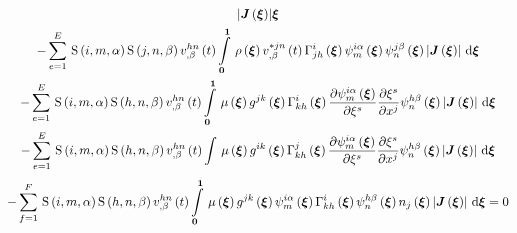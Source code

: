 \begin{multline}
{{      \abs{\fnof{\matr{J}}{\vectr{\xi}}}}{\vectr{\xi}}}\\
  -\gsum{e=1}{E}{\idxgsf{i}{m}{\alpha}\idxgsf{j}{n}{\beta}\fnof{\idxnodedof{v}{h}{n}{\beta}}{t}
    \gint{\vectr{0}}{\vectr{1}}{\fnof{\rho}{\vectr{\xi}}\fnof{\idxnodedof{v}{*j}{n}{\beta}}{t}
      \fnof{\christoffel{i}{j}{h}}{\vectr{\xi}}\idxgbfn{i}{m}{\alpha}{\vectr{\xi}}
      \idxgbfn{j}{n}{\beta}{\vectr{\xi}}\abs{\fnof{\matr{J}}{\vectr{\xi}}}}{\vectr{\xi}}}\\
  -\gsum{e=1}{E}{\idxgsf{i}{m}{\alpha}\idxgsf{h}{n}{\beta}\fnof{\idxnodedof{v}{h}{n}{\beta}}{t}
    \gint{\vectr{0}}{\vectr{1}}{\fnof{\mu}{\vectr{\xi}}\fnof{g^{jk}}{\vectr{\xi}}\fnof{\christoffel{i}{k}{h}}{\vectr{\xi}}
      \delby{\idxgbfn{i}{m}{\alpha}{\vectr{\xi}}}{\xi^{s}}\delby{\xi^{s}}{x^{j}}
      \idxgbfn{h}{n}{\beta}{\vectr{\xi}}\abs{\fnof{\matr{J}}{\vectr{\xi}}}}{\vectr{\xi}}}\\
  -\gsum{e=1}{E}{\idxgsf{i}{m}{\alpha}\idxgsf{h}{n}{\beta}\fnof{\idxnodedof{v}{h}{n}{\beta}}{t}
    \gint{}{}{\fnof{\mu}{\vectr{\xi}}\fnof{g^{ik}}{\vectr{\xi}}\fnof{\christoffel{j}{k}{h}}{\vectr{\xi}}
      \delby{\idxgbfn{i}{m}{\alpha}{\vectr{\xi}}}{\xi^{s}}\delby{\xi^{s}}{x^{j}}
      \idxgbfn{h}{n}{\beta}{\vectr{\xi}}\abs{\fnof{\matr{J}}{\vectr{\xi}}}}{\vectr{\xi}}}\\
  -\gsum{f=1}{F}{\idxgsf{i}{m}{\alpha}\idxgsf{h}{n}{\beta}\fnof{\idxnodedof{v}{h}{n}{\beta}}{t}
    \gint{\vectr{0}}{\vectr{1}}{\fnof{\mu}{\vectr{\xi}}\fnof{g^{jk}}{\vectr{\xi}}\idxgbfn{i}{m}{\alpha}{\vectr{\xi}}
      \fnof{\christoffel{i}{k}{h}}{\vectr{\xi}}\idxgbfn{h}{n}{\beta}{\vectr{\xi}}\fnof{n_{j}}{\vectr{\xi}}
      \abs{\fnof{\matr{J}}{\vectr{\xi}}}}{\vectr{\xi}}}=0
  \label{eqn:FEM4StokesEquation}
\end{multline}

